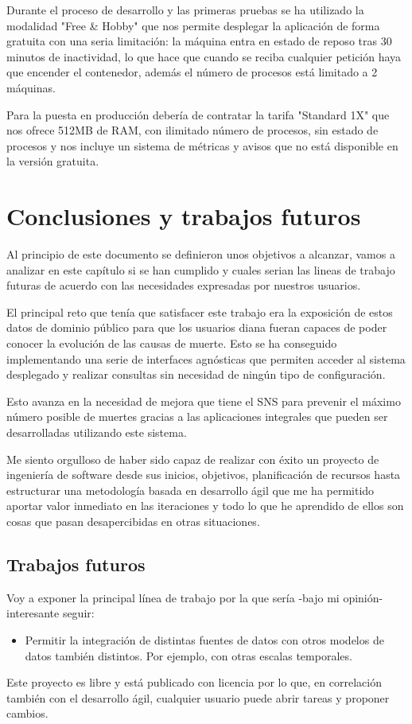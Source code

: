 Durante el proceso de desarrollo y las primeras pruebas se ha utilizado la modalidad "Free
\& Hobby" que nos permite desplegar la aplicación de forma gratuita con una seria
limitación: la máquina entra en estado de reposo tras 30 minutos de inactividad, lo que
hace que cuando se reciba cualquier petición haya que encender el contenedor, además el
número de procesos está limitado a 2 máquinas.

Para la puesta en producción debería de contratar la tarifa "Standard 1X" que nos ofrece
512MB de RAM, con ilimitado número de procesos, sin estado de procesos y nos incluye un
sistema de métricas y avisos que no está disponible en la versión gratuita.

\chapter{Conclusiones y trabajos futuros}
Al principio de este documento se definieron unos objetivos a alcanzar, vamos a analizar
en este capítulo si se han cumplido y cuales serian las lineas de trabajo futuras de
acuerdo con las necesidades expresadas por nuestros usuarios.

El principal reto que tenía que satisfacer este trabajo era la exposición de estos datos
de dominio público para que los usuarios diana fueran capaces de poder conocer la
evolución de las causas de muerte. Esto se ha conseguido implementando una serie de
interfaces agnósticas que permiten acceder al sistema desplegado y realizar consultas sin
necesidad de ningún tipo de configuración. 

Esto avanza en la necesidad de mejora que tiene el \Gls{SNS} para prevenir el máximo número
posible de muertes gracias a las aplicaciones integrales que pueden ser desarrolladas
utilizando este sistema.

Me siento orgulloso de haber sido capaz de realizar con éxito un proyecto de ingeniería de
software desde sus inicios, objetivos, planificación de recursos hasta estructurar una
metodología basada en desarrollo ágil que me ha permitido aportar valor inmediato en las
iteraciones y todo lo que he aprendido de ellos son cosas que pasan desapercibidas en otras situaciones.

\section{Trabajos futuros}
Voy a exponer la principal línea de trabajo por la que sería -bajo mi opinión- interesante seguir:
\begin{itemize}
    \item Permitir la integración de distintas fuentes de datos con otros modelos de datos
    también distintos. Por ejemplo, con otras escalas temporales.
\end{itemize}
Este proyecto es libre y está publicado con licencia \cite{gplv3} por lo que, en
correlación también con el desarrollo ágil, cualquier usuario puede abrir tareas y
proponer cambios.
